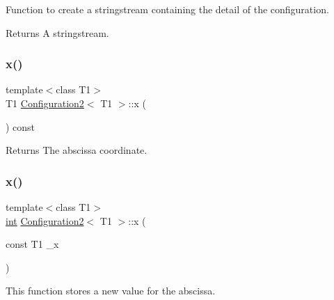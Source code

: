 Function to create a stringstream containing the detail of the configuration. 

\begin{DoxyReturn}{Returns}
A stringstream. 
\end{DoxyReturn}
\mbox{\label{class_configuration2_a430b4b412cbdad376feec03c52bde56f}} 
\subsubsection{\texorpdfstring{x()}{x()}\hspace{0.1cm}{\footnotesize\ttfamily [1/2]}}
{\footnotesize\ttfamily template$<$class T1$>$ \\
T1 \mbox{\hyperlink{class_configuration2}{Configuration2}}$<$ T1 $>$\+::x (\begin{DoxyParamCaption}{ }\end{DoxyParamCaption}) const\hspace{0.3cm}{\ttfamily [inline]}}

\begin{DoxyReturn}{Returns}
The abscissa coordinate. 
\end{DoxyReturn}
\mbox{\label{class_configuration2_ac8b1ca22acbfd0c59d145eb3ac42f39d}} 
\subsubsection{\texorpdfstring{x()}{x()}\hspace{0.1cm}{\footnotesize\ttfamily [2/2]}}
{\footnotesize\ttfamily template$<$class T1$>$ \\
\mbox{\hyperlink{draw_8hh_aa620a13339ac3a1177c86edc549fda9b}{int}} \mbox{\hyperlink{class_configuration2}{Configuration2}}$<$ T1 $>$\+::x (\begin{DoxyParamCaption}\item[{const T1}]{\+\_\+x }\end{DoxyParamCaption})\hspace{0.3cm}{\ttfamily [inline]}}



This function stores a new value for the abscissa. 


